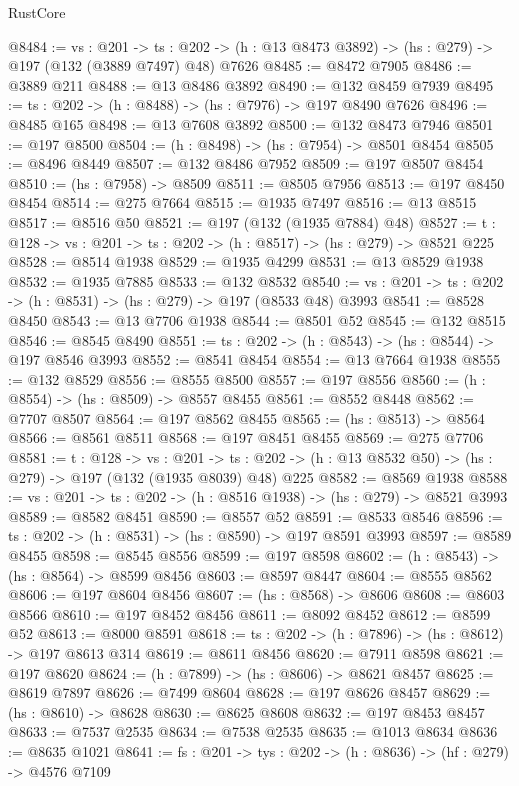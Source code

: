 \begin{lexlean}{RustCore}
\begin{coremodule}
@8484 := {vs : @201} ->
  {ts : @202} -> (h : @13 @8473 @3892) -> (hs : @279) -> @197 (@132 (@3889 @7497) @48) @7626
@8485 := @8472 @7905
@8486 := @3889 @211
@8488 := @13 @8486 @3892
@8490 := @132 @8459 @7939
@8495 := {ts : @202} -> (h : @8488) -> (hs : @7976) -> @197 @8490 @7626
@8496 := @8485 @165
@8498 := @13 @7608 @3892
@8500 := @132 @8473 @7946
@8501 := @197 @8500
@8504 := (h : @8498) -> (hs : @7954) -> @8501 @8454
@8505 := @8496 @8449
@8507 := @132 @8486 @7952
@8509 := @197 @8507 @8454
@8510 := (hs : @7958) -> @8509
@8511 := @8505 @7956
@8513 := @197 @8450 @8454
@8514 := @275 @7664
@8515 := @1935 @7497
@8516 := @13 @8515
@8517 := @8516 @50
@8521 := @197 (@132 (@1935 @7884) @48)
@8527 := {t : @128} -> {vs : @201} -> {ts : @202} -> (h : @8517) -> (hs : @279) -> @8521 @225
@8528 := @8514 @1938
@8529 := @1935 @4299
@8531 := @13 @8529 @1938
@8532 := @1935 @7885
@8533 := @132 @8532
@8540 := {vs : @201} -> {ts : @202} -> (h : @8531) -> (hs : @279) -> @197 (@8533 @48) @3993
@8541 := @8528 @8450
@8543 := @13 @7706 @1938
@8544 := @8501 @52
@8545 := @132 @8515
@8546 := @8545 @8490
@8551 := {ts : @202} -> (h : @8543) -> (hs : @8544) -> @197 @8546 @3993
@8552 := @8541 @8454
@8554 := @13 @7664 @1938
@8555 := @132 @8529
@8556 := @8555 @8500
@8557 := @197 @8556
@8560 := (h : @8554) -> (hs : @8509) -> @8557 @8455
@8561 := @8552 @8448
@8562 := @7707 @8507
@8564 := @197 @8562 @8455
@8565 := (hs : @8513) -> @8564
@8566 := @8561 @8511
@8568 := @197 @8451 @8455
@8569 := @275 @7706
@8581 := {t : @128} ->
  {vs : @201} ->
  {ts : @202} -> (h : @13 @8532 @50) -> (hs : @279) -> @197 (@132 (@1935 @8039) @48) @225
@8582 := @8569 @1938
@8588 := {vs : @201} -> {ts : @202} -> (h : @8516 @1938) -> (hs : @279) -> @8521 @3993
@8589 := @8582 @8451
@8590 := @8557 @52
@8591 := @8533 @8546
@8596 := {ts : @202} -> (h : @8531) -> (hs : @8590) -> @197 @8591 @3993
@8597 := @8589 @8455
@8598 := @8545 @8556
@8599 := @197 @8598
@8602 := (h : @8543) -> (hs : @8564) -> @8599 @8456
@8603 := @8597 @8447
@8604 := @8555 @8562
@8606 := @197 @8604 @8456
@8607 := (hs : @8568) -> @8606
@8608 := @8603 @8566
@8610 := @197 @8452 @8456
@8611 := @8092 @8452
@8612 := @8599 @52
@8613 := @8000 @8591
@8618 := {ts : @202} -> (h : @7896) -> (hs : @8612) -> @197 @8613 @314
@8619 := @8611 @8456
@8620 := @7911 @8598
@8621 := @197 @8620
@8624 := (h : @7899) -> (hs : @8606) -> @8621 @8457
@8625 := @8619 @7897
@8626 := @7499 @8604
@8628 := @197 @8626 @8457
@8629 := (hs : @8610) -> @8628
@8630 := @8625 @8608
@8632 := @197 @8453 @8457
@8633 := @7537 @2535
@8634 := @7538 @2535
@8635 := @1013 @8634
@8636 := @8635 @1021
@8641 := {fs : @201} -> {tys : @202} -> (h : @8636) -> (hf : @279) -> @4576 @7109

\end{coremodule}
\end{lexlean}
